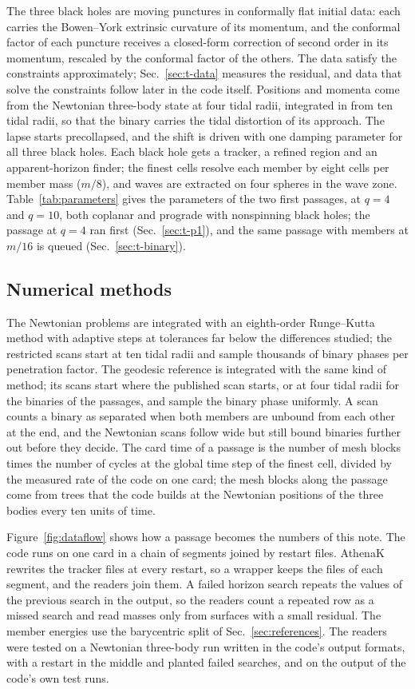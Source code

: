 \documentclass[aps,prd,twocolumn,10pt,superscriptaddress,nofootinbib,longbibliography,floatfix]{revtex4-2}
\begin{document}
The three black holes are moving punctures in conformally flat initial data: each carries the Bowen--York extrinsic curvature of its momentum, and the conformal factor of each puncture receives a closed-form correction of second order in its momentum, rescaled by the conformal factor of the others. The data satisfy the constraints approximately; Sec.~\ref{sec:t-data} measures the residual, and data that solve the constraints follow later in the code itself. Positions and momenta come from the Newtonian three-body state at four tidal radii, integrated in from ten tidal radii, so that the binary carries the tidal distortion of its approach. The lapse starts precollapsed, and the shift is driven with one damping parameter for all three black holes. Each black hole gets a tracker, a refined region and an apparent-horizon finder; the finest cells resolve each member by eight cells per member mass ($m/8$), and waves are extracted on four spheres in the wave zone. Table~\ref{tab:parameters} gives the parameters of the two first passages, at $q=4$ and $q=10$, both coplanar and prograde with nonspinning black holes; the passage at $q=4$ ran first (Sec.~\ref{sec:t-p1}), and the same passage with members at $m/16$ is queued (Sec.~\ref{sec:t-binary}).

\subsection{Numerical methods}\label{sec:methods}

The Newtonian problems are integrated with an eighth-order Runge--Kutta method with adaptive steps at tolerances far below the differences studied; the restricted scans start at ten tidal radii and sample thousands of binary phases per penetration factor. The geodesic reference is integrated with the same kind of method; its scans start where the published scan starts, or at four tidal radii for the binaries of the passages, and sample the binary phase uniformly. A scan counts a binary as separated when both members are unbound from each other at the end, and the Newtonian scans follow wide but still bound binaries further out before they decide. The card time of a passage is the number of mesh blocks times the number of cycles at the global time step of the finest cell, divided by the measured rate of the code on one card; the mesh blocks along the passage come from trees that the code builds at the Newtonian positions of the three bodies every ten units of time.

Figure~\ref{fig:dataflow} shows how a passage becomes the numbers of this note. The code runs on one card in a chain of segments joined by restart files. AthenaK rewrites the tracker files at every restart, so a wrapper keeps the files of each segment, and the readers join them. A failed horizon search repeats the values of the previous search in the output, so the readers count a repeated row as a missed search and read masses only from surfaces with a small residual. The member energies use the barycentric split of Sec.~\ref{sec:references}. The readers were tested on a Newtonian three-body run written in the code's output formats, with a restart in the middle and planted failed searches, and on the output of the code's own test runs.
\end{document}
